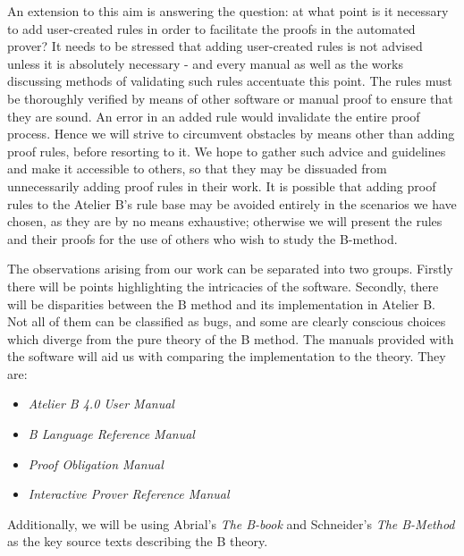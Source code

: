 \documentclass[12pt,journal,duplex]{IEEEtran}
\begin{document}
	An extension to this aim is answering the question: at what point is it necessary to add user-created rules in order to facilitate the proofs in the automated prover? It needs to be stressed that adding user-created rules is not advised unless it is absolutely necessary - and every manual as well as the works discussing methods of validating such rules accentuate this point. The rules must be thoroughly verified by means of other software or manual proof to ensure that they are sound. An error in an added rule would invalidate the entire proof process. Hence we will strive to circumvent obstacles by means other than adding proof rules, before resorting to it. We hope to gather such advice and guidelines and make it accessible to others, so that they may be dissuaded from unnecessarily adding proof rules in their work. It is possible that adding proof rules to the Atelier B's rule base may be avoided entirely in the scenarios we have chosen, as they are by no means exhaustive; otherwise we will present the rules and their proofs for the use of others who wish to study the B-method.

	The observations arising from our work can be separated into two groups. Firstly there will be points highlighting the intricacies of the software. 	Secondly, there will be disparities between the B method and its implementation in Atelier B. Not all of them can be classified as bugs, and some are clearly conscious choices which diverge from the pure theory of the B method. The manuals provided with the software will aid us with comparing the implementation to the theory. They are:

	\begin{itemize}
		\item \emph{Atelier B 4.0 User Manual}
		\item \emph{B Language Reference Manual}
		\item \emph{Proof Obligation Manual}
		\item \emph{Interactive Prover Reference Manual}
	\end{itemize}

	Additionally, we will be using Abrial's \emph{The B-book} and Schneider's \emph{The B-Method} as the key source texts describing the B theory.
\end{document}
